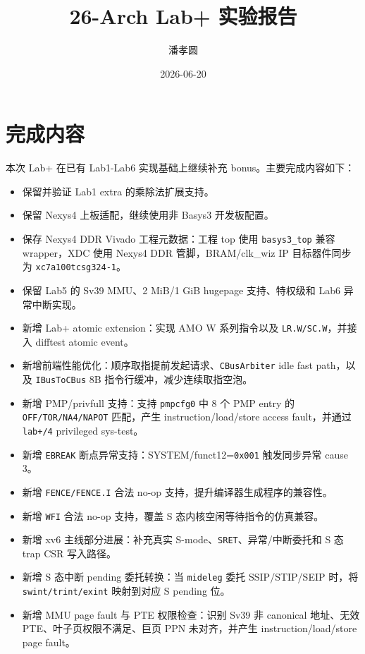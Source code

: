 \documentclass[UTF8,a4paper,11pt]{ctexart}
\title{26-Arch Lab+ 实验报告}
\author{潘孝圆 \quad 24300240128}
\date{2026-06-20}
\begin{document}
\maketitle

\section{完成内容}

本次 Lab+ 在已有 Lab1-Lab6 实现基础上继续补充 bonus。主要完成内容如下：

\begin{itemize}
  \item 保留并验证 Lab1 extra 的乘除法扩展支持。
  \item 保留 Nexys4 上板适配，继续使用非 Basys3 开发板配置。
  \item 保存 Nexys4 DDR Vivado 工程元数据：工程 top 使用 \texttt{basys3\_top} 兼容 wrapper，XDC 使用 Nexys4 DDR 管脚，BRAM/clk\_wiz IP 目标器件同步为 \texttt{xc7a100tcsg324-1}。
  \item 保留 Lab5 的 Sv39 MMU、2 MiB/1 GiB hugepage 支持、特权级和 Lab6 异常中断实现。
  \item 新增 Lab+ atomic extension：实现 AMO W 系列指令以及 \texttt{LR.W/SC.W}，并接入 difftest atomic event。
  \item 新增前端性能优化：顺序取指提前发起请求、\texttt{CBusArbiter} idle fast path，以及 \texttt{IBusToCBus} 8B 指令行缓冲，减少连续取指空泡。
  \item 新增 PMP/privfull 支持：支持 \texttt{pmpcfg0} 中 8 个 PMP entry 的 \texttt{OFF/TOR/NA4/NAPOT} 匹配，产生 instruction/load/store access fault，并通过 \texttt{lab+/4} privileged sys-test。
  \item 新增 \texttt{EBREAK} 断点异常支持：SYSTEM/funct12=\texttt{0x001} 触发同步异常 cause 3。
  \item 新增 \texttt{FENCE/FENCE.I} 合法 no-op 支持，提升编译器生成程序的兼容性。
  \item 新增 \texttt{WFI} 合法 no-op 支持，覆盖 S 态内核空闲等待指令的仿真兼容。
  \item 新增 xv6 主线部分进展：补充真实 S-mode、\texttt{SRET}、异常/中断委托和 S 态 trap CSR 写入路径。
  \item 新增 S 态中断 pending 委托转换：当 \texttt{mideleg} 委托 SSIP/STIP/SEIP 时，将 \texttt{swint/trint/exint} 映射到对应 S pending 位。
  \item 新增 MMU page fault 与 PTE 权限检查：识别 Sv39 非 canonical 地址、无效 PTE、叶子页权限不满足、巨页 PPN 未对齐，并产生 instruction/load/store page fault。

\end{itemize}
\end{document}
